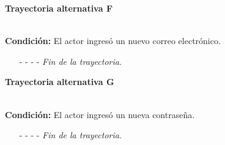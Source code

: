 \hypertarget{CU3-2:TAF}{\textbf{Trayectoria alternativa F}}\\
\noindent \textbf{Condición:} El actor ingresó un nuevo correo electrónico.
\begin{enumerate}
	\UCpaso[\UCsist] Envía un correo con el mensaje  a la nueva cuenta de correo electrónico proporcionada por el actor.
	\UCpaso Regresa al paso \ref{CU3.2-P10} de la trayectoria principal.
	\item[- -] - - {\em {Fin de la trayectoria}}.
\end{enumerate}
\hypertarget{CU3-2:TAG}{\textbf{Trayectoria alternativa G}}\\
\noindent \textbf{Condición:} El actor ingresó un nueva contraseña.
\begin{enumerate}
	\UCpaso[\UCsist] Envía un correo con el mensaje  con las nuevas credenciales a la cuenta de correo electrónico proporcionada por el actor.
	\UCpaso Regresa al paso \ref{CU3.2-P10} de la trayectoria principal.
	\item[- -] - - {\em {Fin de la trayectoria}}.
\end{enumerate}